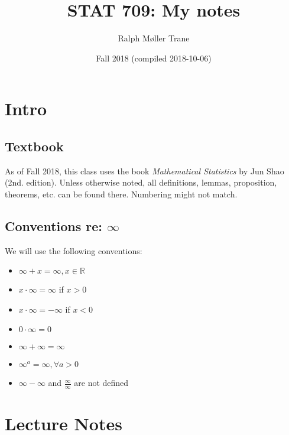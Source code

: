 \documentclass[]{book}
\title{STAT 709: My notes}
\author{Ralph Møller Trane}
\date{Fall 2018 (compiled 2018-10-06)}
\providecommand{\tightlist}{%
  \setlength{\itemsep}{0pt}\setlength{\parskip}{0pt}}
\theoremstyle{definition}
\theoremstyle{definition}
\theoremstyle{definition}
\theoremstyle{remark}
\begin{document}
\maketitle

{
\setcounter{tocdepth}{1}
\tableofcontents
}
\newcommand{\mc}[1]{\mathcal{#1}}
\renewcommand{\B}{\mathcal{B}}
\renewcommand{\C}{\mathcal{C}}
\newcommand{\F}{\mathcal{F}}

\newcommand{\mb}[1]{\mathbb{#1}}
\renewcommand{\P}{\mathbb{P}}
\newcommand{\R}{\mathbb{R}}

\newcommand{\norm}[1]{\left | \left | #1 \right | \right |}

\chapter{Intro}\label{intro}

\section{Textbook}\label{textbook}

As of Fall 2018, this class uses the book \emph{Mathematical Statistics}
by Jun Shao (2nd. edition). Unless otherwise noted, all definitions,
lemmas, proposition, theorems, etc. can be found there. Numbering might
not match.

\section{\texorpdfstring{Conventions re:
\(\infty\)}{Conventions re: \textbackslash{}infty}}\label{conventions-re-infty}

We will use the following conventions:

\begin{itemize}
\tightlist
\item
  \(\infty + x = \infty, x \in \R\)
\item
  \(x\cdot \infty = \infty\) if \(x > 0\)
\item
  \(x\cdot \infty = -\infty\) if \(x < 0\)
\item
  \(0\cdot \infty = 0\)
\item
  \(\infty + \infty = \infty\)
\item
  \(\infty^a = \infty, \forall a > 0\)
\item
  \(\infty - \infty\) and \(\frac{\infty}{\infty}\) are not defined
\end{itemize}

\chapter{Lecture Notes}\label{lectures}
\end{document}
